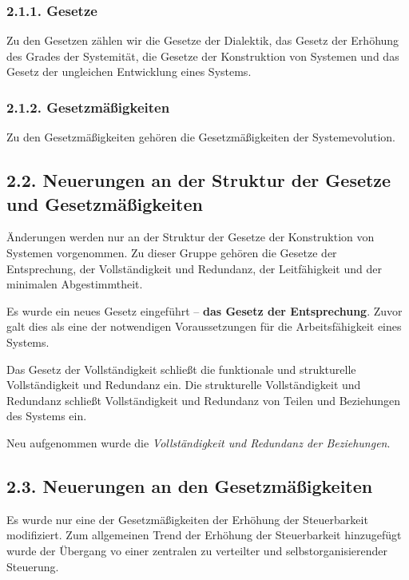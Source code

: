 \documentclass[11pt,a4paper]{article}
\begin{document}
\subsubsection{2.1.1. Gesetze}
Zu den Gesetzen zählen wir die Gesetze der Dialektik, das Gesetz der Erhöhung
des Grades der Systemität, die Gesetze der Konstruktion von Systemen und das
Gesetz der ungleichen Entwicklung eines Systems.

\subsubsection{2.1.2. Gesetzmäßigkeiten}
Zu den Gesetzmäßigkeiten gehören die Gesetzmäßigkeiten der Systemevolution.

\subsection{2.2. Neuerungen an der Struktur der Gesetze und Gesetzmäßigkeiten} 

Änderungen werden nur an der Struktur der Gesetze der Konstruktion von
Systemen vorgenommen.  Zu dieser Gruppe gehören die Gesetze der Entsprechung,
der Vollständigkeit und Redundanz, der Leitfähigkeit und der minimalen
Abgestimmtheit.

Es wurde ein neues Gesetz eingeführt -- \textbf{das Gesetz der Entsprechung}.
Zuvor galt dies als eine der notwendigen Voraussetzungen für die
Arbeitsfähigkeit eines Systems.

Das Gesetz der Vollständigkeit schließt die funktionale und strukturelle
Vollständigkeit und Redundanz ein.  Die strukturelle Vollständigkeit und
Redundanz schließt Vollständigkeit und Redundanz von Teilen und Beziehungen
des Systems ein.

Neu aufgenommen wurde die \emph{Vollständigkeit und Redundanz der
  Beziehungen}.

\subsection{2.3. Neuerungen an den Gesetzmäßigkeiten}

Es wurde nur eine der Gesetzmäßigkeiten der Erhöhung der Steuerbarkeit
modifiziert.  Zum allgemeinen Trend der Erhöhung der Steuerbarkeit hinzugefügt
wurde der Übergang vo einer zentralen zu verteilter und selbstorganisierender
Steuerung.
\end{document}
